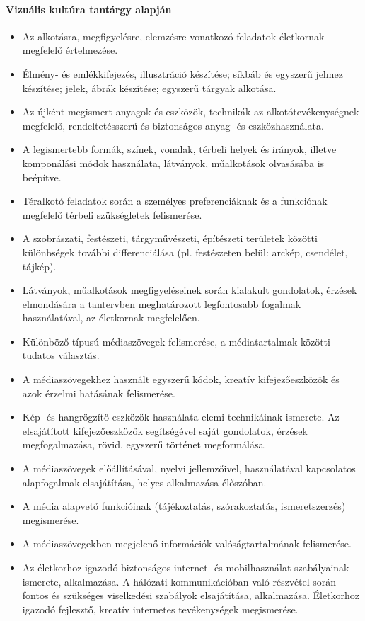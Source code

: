 \paragraph{Vizuális kultúra tantárgy alapján}
\begin{itemize}
\item Az alkotásra, megfigyelésre, elemzésre vonatkozó feladatok életkornak megfelelő értelmezése.
\item Élmény- és emlékkifejezés, illusztráció készítése; síkbáb és egyszerű jelmez készítése; jelek, ábrák készítése; egyszerű tárgyak alkotása.
\item Az újként megismert anyagok és eszközök, technikák az alkotótevékenységnek megfelelő, rendeltetésszerű és biztonságos anyag- és eszközhasználata.
\item A legismertebb formák, színek, vonalak, térbeli helyek és irányok, illetve komponálási módok használata, látványok, műalkotások olvasásába is beépítve.
\item Téralkotó feladatok során a személyes preferenciáknak és a funkciónak megfelelő térbeli szükségletek felismerése.
\item A szobrászati, festészeti, tárgyművészeti, építészeti területek közötti különbségek további differenciálása (pl. festészeten belül: arckép, csendélet, tájkép).
\item Látványok, műalkotások megfigyeléseinek során kialakult gondolatok, érzések elmondására a tantervben meghatározott legfontosabb fogalmak használatával, az életkornak megfelelően.
\item Különböző típusú médiaszövegek felismerése, a médiatartalmak közötti tudatos választás.
\item A médiaszövegekhez használt egyszerű kódok, kreatív kifejezőeszközök és azok érzelmi hatásának felismerése.
\item Kép- és hangrögzítő eszközök használata elemi technikáinak ismerete. Az elsajátított kifejezőeszközök segítségével saját gondolatok, érzések megfogalmazása, rövid, egyszerű történet megformálása.
\item A médiaszövegek előállításával, nyelvi jellemzőivel, használatával kapcsolatos alapfogalmak elsajátítása, helyes alkalmazása élőszóban.
\item A média alapvető funkcióinak (tájékoztatás, szórakoztatás, ismeretszerzés) megismerése.
\item A médiaszövegekben megjelenő információk valóságtartalmának felismerése.
\item Az életkorhoz igazodó biztonságos internet- és mobilhasználat szabályainak ismerete, alkalmazása. A hálózati kommunikációban való részvétel során fontos és szükséges viselkedési szabályok elsajátítása, alkalmazása. Életkorhoz igazodó fejlesztő, kreatív internetes tevékenységek megismerése.
\end{itemize}
